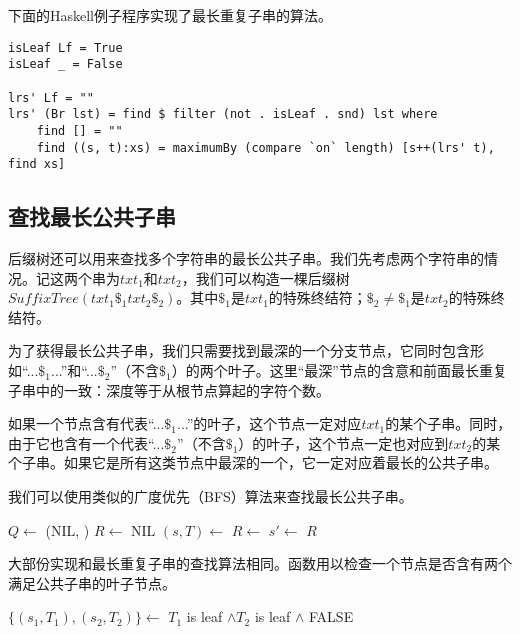\documentclass{ctexart}
\begin{document}
下面的Haskell例子程序实现了最长重复子串的算法。

\lstset{language=Haskell}
\begin{lstlisting}[style=Haskell]
isLeaf Lf = True
isLeaf _ = False

lrs' Lf = ""
lrs' (Br lst) = find $ filter (not . isLeaf . snd) lst where
    find [] = ""
    find ((s, t):xs) = maximumBy (compare `on` length) [s++(lrs' t), find xs]
\end{lstlisting} %

\subsection{查找最长公共子串}

后缀树还可以用来查找多个字符串的最长公共子串。我们先考虑两个字符串的情况。记这两个串为$txt_1$和$txt_2$，我们可以构造一棵后缀树$SuffixTree(txt_1\$_1txt_2\$_2)$。其中$\$_1$是$txt_1$的特殊终结符；$\$_2 \neq \$_1$是$txt_2$的特殊终结符。

为了获得最长公共子串，我们只需要找到最深的一个分支节点，它同时包含形如“...$\$_1$...”和“...$\$_2$”（不含$\$_1$）的两个叶子。这里“最深”节点的含意和前面最长重复子串中的一致：深度等于从根节点算起的字符个数。

如果一个节点含有代表“...$\$_1$...”的叶子，这个节点一定对应$txt_1$的某个子串。同时，由于它也含有一个代表“...$\$_2$”（不含$\$_1$）的叶子，这个节点一定也对应到$txt_2$的某个子串。如果它是所有这类节点中最深的一个，它一定对应着最长的公共子串。

我们可以使用类似的广度优先（BFS）算法来查找最长公共子串。

\begin{algorithmic}[1]
  \State $Q \gets$ (NIL, )
  \State $R \gets$ NIL
    \State $(s, T) \gets$ 
      \State $R \gets$ 
    \EndIf
        \State $s' \gets$ 
        \State {}
      \EndIf
    \EndFor
  \EndWhile
  \State \Return $R$
\EndFunction
\end{algorithmic}

大部份实现和最长重复子串的查找算法相同。函数用以检查一个节点是否含有两个满足公共子串的叶子节点。

\begin{algorithmic}[1]
    \State $\{(s_1, T_1), (s_2, T_2)\} \gets$ 
    \State \Return $T_1$ is leaf $\land T_2$ is leaf $\land$ 
  \EndIf
  \State \Return FALSE
\EndFunction
\end{algorithmic}
\end{document}
